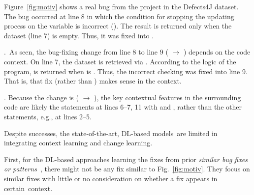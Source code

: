 Figure~\ref{fig:motiv} shows a real bug from the project 
in the Defects4J dataset. The bug occurred at line 8 in which the
condition for stopping the updating process on the 
variable is incorrect (). The result is
returned only when the dataset (line 7) is empty. Thus, it was fixed
into .


.~As
seen, the bug-fixing change from line 8 to line 9 ( $\rightarrow$ ) depends on the
code context.
On line 7, the dataset is retrieved via . According
to the logic of the program,  is returned when
 is .  Thus, the incorrect checking was fixed
into line 9. That is, that fix  (rather
than ) makes sense in the context.


\vspace{2pt}
.
Because the change is ( \code{!=} 
$\rightarrow$  \code{==} ), the key
contextual features in the surrounding code are likely the statements
at lines 6--7, 11 with  and , rather
than the other statements, e.g., at lines 2--5.


Despite successes, the state-of-the-art, DL-based models~are
limited in integrating context learning and change learning.

First, for the DL-based approaches learning the fixes
from prior {\em similar bug fixes or
  patterns}~\cite{gupta2017deepfix,white2019sorting,white2016deep},
there might not be any fix similar to Fig.~\ref{fig:motiv}. They focus
on similar fixes with little or no consideration on whether a fix
appears in certain~context.

